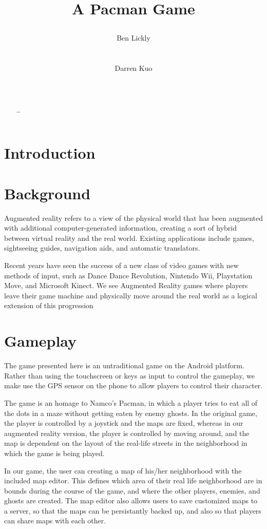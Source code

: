 \documentclass{acm_proc_article-sp}
\title{A Pacman Game
\numberofauthors{2}
\author{
\alignauthor Ben Lickly \\
       \affaddr{University of California, Berkeley}\\
       \affaddr{Berkeley, CA, USA} \\
       \email{blickly@eecs.berkeley.edu}
\alignauthor Darren Kuo \\
       \affaddr{University of California, Berkeley}\\
       \affaddr{Berkeley, CA, USA} \\
       \email{darrenkuo@eecs.berkeley.edu}
}
}
\begin{document}
\maketitle

\begin{abstract}
\ldots
\cite{ZombieRun}
\end{abstract}

\section{Introduction}
\section{Background}
Augmented reality refers to a view of the physical world that has been
augmented with additional computer-generated information, creating a
sort of hybrid between virtual reality and the real world. Existing
applications include games, sightseeing guides, navigation aids, and
automatic translators.

Recent years have seen the success of a new class of video games with
new methods of input, such as Dance Dance Revolution, Nintendo Wii,
Playstation Move, and Microsoft Kinect. We see Augmented Reality games
where players leave their game machine and physically move around the
real world as a logical extension of this progression

\section{Gameplay}
The game presented here is an untraditional game on the Android platform.
Rather than using the touchscreen or keys as input to control the gameplay,
we make use the GPS sensor on the phone to allow players to control their character.

The game is an homage to Namco's Pacman, in which a player tries to eat all
of the dots in a maze without getting eaten by enemy ghosts. In the original
game, the player is controlled by a joystick and the maps are fixed, whereas
in our augmented reality version, the player is controlled by moving around,
and the map is dependent on the layout of the real-life streets in the
neighborhood in which the game is being played.


In our game, the user can creating a map of his/her neighborhood with
the included map editor.
This defines which area of their real life neighborhood are in bounds during
the course of the game, and where the other players, enemies, and ghosts are
created.
The map editor also allows users to save customized maps to a server,
so that the maps can be persistantly backed up, and also so that players
can share maps with each other.
\end{document}
